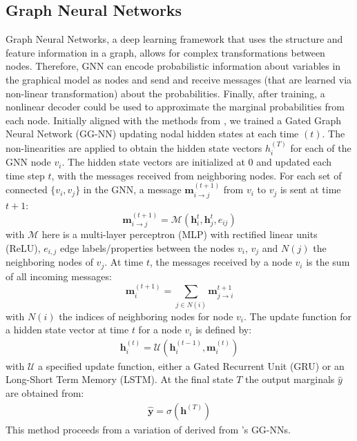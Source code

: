 \documentclass{article}
\begin{document}
\subsection{Graph Neural Networks}
Graph Neural Networks, a deep learning framework that uses the structure and feature information in a graph, allows for complex transformations between nodes. Therefore, GNN can encode probabilistic information about variables in the graphical model as nodes and send and receive messages (that are learned via non-linear transformation) about the probabilities. 
Finally, after training, a nonlinear decoder could be used to approximate the marginal probabilities from each node. 
Initially aligned with the methods from \cite{inf_pgm_gnn}, we trained a Gated Graph Neural Network (GG-NN) \cite{ggnn} updating nodal hidden states at each time $(t)$. The non-linearities are applied to obtain the hidden state vectors $h_i^{(T)}$ for each of the GNN node $v_i$. The hidden state vectors are initialized at $0$ and updated each time step $t$, with the messages received from neighboring nodes.
For each set of connected $\{v_i, v_j\}$ in the GNN, a message $\bm{m}^{(t+1)}_{i\rightarrow j}$ from $v_i$ to $v_j$ is sent at time $t+1$:
\begin{equation}
    \bm{m}^{(t+1)}_{i \to j} = \mathcal{M}\left(\bm{h}^t_i, \bm{h}^t_j, e_{ij}\right)
\end{equation}
with $\mathcal{M}$ here is a multi-layer perceptron (MLP) with rectified linear units (ReLU), $e_{i, j}$ edge labels/properties between the nodes $v_i$, $v_j$ and $N(j)$ the neighboring nodes of $v_j$. 
At time $t$, the messages received by a node $v_i$ is the sum of all  incoming messages:
\begin{equation}
    \bm{m}_{i}^{(t+1)} = \sum_{j \in N(i)} \bm{m}^{t+1}_{j \to i}
\end{equation}
with $N(i)$ the indices of neighboring nodes for node $v_i$.
The update function for a hidden state vector at time $t$ for a node $v_i$ is defined by:
\begin{align*}
    \bm{h}_i^{(t)} = \mathcal{U}(\bm{h}_i^{(t-1)}, \bm{m}_{i}^{(t)})
\end{align*}
with $\mathcal{U}$ a specified update function, either a Gated Recurrent Unit (GRU) or an Long-Short Term Memory (LSTM). At the final state $T$ the output marginals $\hat{y}$ are obtained from:
\begin{align*}
    \bm{\hat{y}} = \sigma (\bm{h}^{(T)})
\end{align*}
This method proceeds from a variation of \cite{inf_pgm_gnn} derived from \cite{ggnn}'s GG-NNs. 
\end{document}
